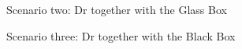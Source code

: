 \documentclass[manuscript,screen,review]{acmart}
\begin{document}
\begin{figure}[h]
    \caption{Scenario two: Dr together with the Glass Box}
    \label{fig:questionnaire-scenario-2}
\end{figure}
\begin{figure}[h]
    \caption{Scenario three: Dr together with the Black Box}
    \label{fig:questionnaire-scenario-3}
\end{figure}
\end{document}
